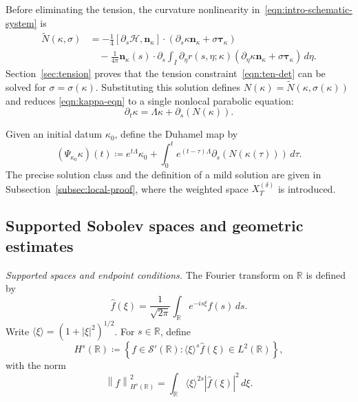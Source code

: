 \documentclass[11pt,reqno]{amsart}
\theoremstyle{plain}
\theoremstyle{definition}
\numberwithin{equation}{section}
\newcommand{\paren}[1]{\left(#1\right)}
\newcommand{\p}{\partial}
\newcommand{\mc}[1]{\mathcal{#1}}
\newcommand{\wh}[1]{\widehat{#1}}
\newcommand{\wt}[1]{\widetilde{#1}}
\newcommand{\bm}[1]{\boldsymbol{#1}}
\newcommand{\abs}[1]{\left\lvert #1 \right\rvert}
\newcommand{\norm}[1]{\left\lVert #1 \right\rVert}
\newcommand{\R}{\mathbb{R}}
\newcommand{\tk}{\bm\tau_\kappa}
\newcommand{\nk}{\bm n_\kappa}
\begin{document}
Before eliminating the tension, the curvature nonlinearity in~\eqref{eqn:intro-schematic-system} is
\begin{equation}
\begin{aligned}
    \wt N(\kappa,\sigma)
    &= -\frac14[\p_s\mc H,\nk]\cdot
    \paren{\p_s\kappa\nk+\sigma\tk}\\
    &\quad -\frac{1}{4\pi}\nk(s)\cdot\p_s\int_I
    \p_\eta r(s,\eta;\kappa)
    \paren{\p_\eta\kappa\nk+\sigma\tk}\,d\eta.
\end{aligned}
\label{eqn:N-def}
\end{equation}
Section~\ref{sec:tension} proves that the tension constraint~\eqref{eqn:ten-det}
can be solved for $\sigma=\sigma(\kappa)$. Substituting this solution defines
$N(\kappa)=\wt N(\kappa,\sigma(\kappa))$ and reduces
\eqref{eqn:kappa-eqn} to a single nonlocal parabolic equation:
\begin{equation}\label{eqn:kap_evo}
    \p_t\kappa=\Lambda\kappa+\p_s\paren{N(\kappa)}.
\end{equation}

Given an initial datum $\kappa_0$, define the Duhamel map by
\begin{equation}\label{eqn:mild-def}
    (\Psi_{\kappa_0}\kappa)(t)
    \coloneqq
    e^{t\Lambda}\kappa_0
    +\int_0^t e^{(t-\tau)\Lambda}
    \p_s\paren{N(\kappa(\tau))}\,d\tau.
\end{equation}
The precise solution class and the definition of a mild solution are given
in Subsection~\ref{subsec:local-proof}, where the weighted space
$X_T^{(\delta)}$ is introduced.

\subsection{Supported Sobolev spaces and geometric estimates}
\label{subsec:notation}

\emph{Supported spaces and endpoint conditions.}
The Fourier transform on $\R$ is defined by
\begin{equation}
    \wh f(\xi) = \frac{1}{\sqrt{2\pi}}\int_{\R} e^{-is\xi}f(s)\,ds.
\end{equation}
Write $\langle\xi\rangle=(1+\abs{\xi}^2)^{1/2}$. For $s\in\R$, define
\begin{equation}
    H^s(\R)
    \coloneqq
    \left\{f\in\mathcal S'(\R):
    \langle\xi\rangle^s\wh f(\xi)\in L^2(\R)\right\},
\end{equation}
with the norm
\begin{equation}
    \norm{f}_{H^s(\R)}^2
    =
    \int_{\R}\langle\xi\rangle^{2s}\abs{\wh f(\xi)}^2\,d\xi .
\end{equation}
\end{document}
